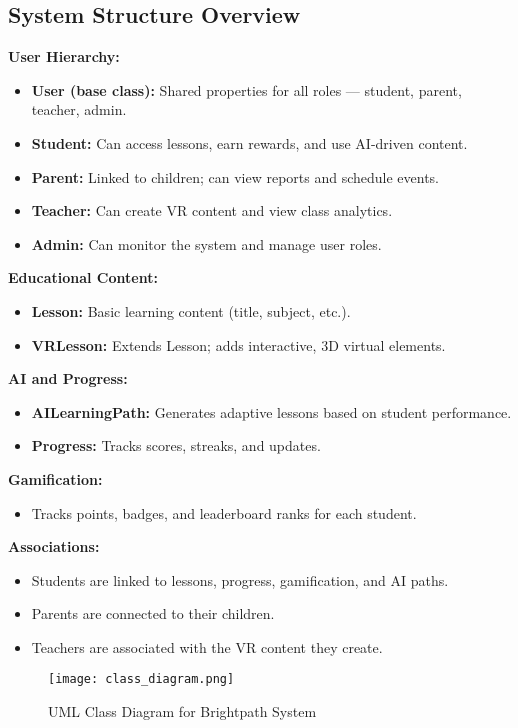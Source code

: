\documentclass[12pt,a4paper]{article}
\begin{document}
\subsection*{System Structure Overview}
\textbf{User Hierarchy:}
\begin{itemize}
  \item \textbf{User (base class):} Shared properties for all roles — student, parent, teacher, admin.
  \item \textbf{Student:} Can access lessons, earn rewards, and use AI-driven content.
  \item \textbf{Parent:} Linked to children; can view reports and schedule events.
  \item \textbf{Teacher:} Can create VR content and view class analytics.
  \item \textbf{Admin:} Can monitor the system and manage user roles.
\end{itemize}

\textbf{Educational Content:}
\begin{itemize}
  \item \textbf{Lesson:} Basic learning content (title, subject, etc.).
  \item \textbf{VRLesson:} Extends Lesson; adds interactive, 3D virtual elements.
\end{itemize}

\textbf{AI and Progress:}
\begin{itemize}
  \item \textbf{AILearningPath:} Generates adaptive lessons based on student performance.
  \item \textbf{Progress:} Tracks scores, streaks, and updates.
\end{itemize}

\textbf{Gamification:}
\begin{itemize}
  \item Tracks points, badges, and leaderboard ranks for each student.
\end{itemize}

\textbf{Associations:}
\begin{itemize}
  \item Students are linked to lessons, progress, gamification, and AI paths.
  \item Parents are connected to their children.
  \item Teachers are associated with the VR content they create.
\end{itemize}


\begin{figure}[H]
  \centering
  \texttt{[image: class\_diagram.png]}
  \caption{UML Class Diagram for Brightpath System}
  \label{fig:class-diagram}
\end{figure}
\end{document}
